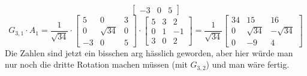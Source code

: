 {$$\begin{bmatrix}
			-3 & 0 & 5
		\end{bmatrix}$$
		$$G_{3,1} \cdot A_1 = \frac{1}{\sqrt{34}} \cdot 
		\begin{bmatrix}
			5 & 0 & 3\\
			0 & \sqrt{34} & 0\\
			-3 & 0 & 5
		\end{bmatrix} \cdot 
		\begin{bmatrix}
			5 & 3 & 2 \\
			0 & 1 & -1 \\
			3 & 0 & 2 
		\end{bmatrix} = \frac{1}{\sqrt{34}}
		\begin{bmatrix}
			34 & 15 & 16 \\
			0 & \sqrt{34} & -\sqrt{34} \\
			0 & -9 & 4
		\end{bmatrix}$$
		\n
		Die Zahlen sind jetzt ein bisschen arg hässlich geworden, aber hier würde man nur noch die dritte Rotation machen müssen (mit $G_{3,2}$) und man wäre fertig.
	}
	 